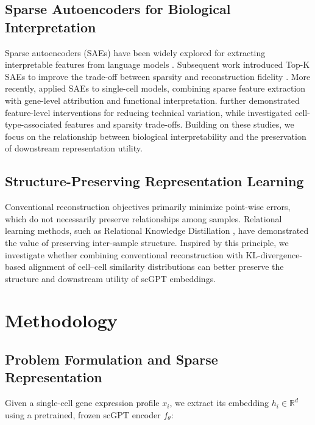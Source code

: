 \documentclass{article}
\begin{document}
\subsection{Sparse Autoencoders for Biological Interpretation}

Sparse autoencoders (SAEs) have been widely explored for extracting interpretable features from language models \citep{bricken2023}. Subsequent work introduced Top-K SAEs to improve the trade-off between sparsity and reconstruction fidelity \citep{gao2025}. More recently, \citet{claye2025} applied SAEs to single-cell models, combining sparse feature extraction with gene-level attribution and functional interpretation. \citet{pedrocchi2025} further demonstrated feature-level interventions for reducing technical variation, while \citet{kendiukhov2026} investigated cell-type-associated features and sparsity trade-offs. Building on these studies, we focus on the relationship between biological interpretability and the preservation of downstream representation utility.

\subsection{Structure-Preserving Representation Learning}

Conventional reconstruction objectives primarily minimize point-wise errors, which do not necessarily preserve relationships among samples. Relational learning methods, such as Relational Knowledge Distillation \citep{park2019}, have demonstrated the value of preserving inter-sample structure. Inspired by this principle, we investigate whether combining conventional reconstruction with KL-divergence-based alignment of cell--cell similarity distributions can better preserve the structure and downstream utility of scGPT embeddings.

\section{Methodology}
\label{sec:methodology}

\subsection{Problem Formulation and Sparse Representation}

Given a single-cell gene expression profile \(x_i\), we extract its embedding \(h_i \in \mathbb{R}^{d}\) using a pretrained, frozen scGPT encoder \(f_\theta\):
\end{document}
